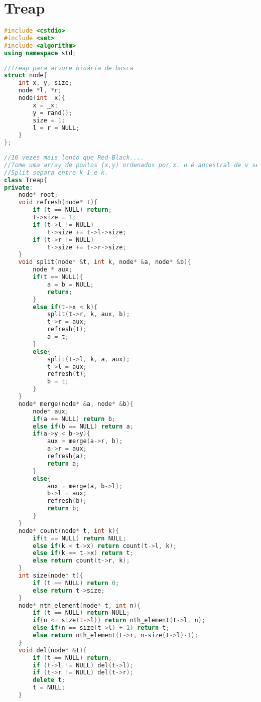 \documentclass[12pt,a4paper,twoside]{report}
\begin{document}
\section{Treap}
\noindent\begin{lstlisting}[caption=Treap,language=C++]
#include <cstdio>
#include <set>
#include <algorithm>
using namespace std;
 
//Treap para arvore binária de busca
struct node{
    int x, y, size;
    node *l, *r;
    node(int _x){
        x = _x;
        y = rand();
        size = 1;
        l = r = NULL;
    }  
};
 
//10 vezes mais lento que Red-Black....
//Tome uma array de pontos (x,y) ordenados por x. u é ancestral de v se e somente se y(u) é maior que todos os elementos de u a v, v incluso!
//Split separa entre k-1 e k.
class Treap{
private:
    node* root;
    void refresh(node* t){
        if (t == NULL) return;
        t->size = 1;
        if (t->l != NULL)
            t->size += t->l->size;
        if (t->r != NULL)
            t->size += t->r->size;
    }
    void split(node* &t, int k, node* &a, node* &b){
        node * aux;
        if(t == NULL){
            a = b = NULL;
            return;
        }
        else if(t->x < k){
            split(t->r, k, aux, b);
            t->r = aux;
            refresh(t);
            a = t;
        }
        else{
            split(t->l, k, a, aux);
            t->l = aux;
            refresh(t);
            b = t;
        }
    }
    node* merge(node* &a, node* &b){
        node* aux;
        if(a == NULL) return b;
        else if(b == NULL) return a;
        if(a->y < b->y){
            aux = merge(a->r, b);
            a->r = aux;
            refresh(a);
            return a;
        }
        else{
            aux = merge(a, b->l);
            b->l = aux;
            refresh(b);
            return b;
        }
    }
    node* count(node* t, int k){
        if(t == NULL) return NULL;
        else if(k < t->x) return count(t->l, k);
        else if(k == t->x) return t;
        else return count(t->r, k);
    }
    int size(node* t){
        if (t == NULL) return 0;
        else return t->size;
    }
    node* nth_element(node* t, int n){
        if (t == NULL) return NULL;
        if(n <= size(t->l)) return nth_element(t->l, n);
        else if(n == size(t->l) + 1) return t;
        else return nth_element(t->r, n-size(t->l)-1);
    }
    void del(node* &t){
        if (t == NULL) return;
        if (t->l != NULL) del(t->l);
        if (t->r != NULL) del(t->r);
        delete t;
        t = NULL;
    }

\end{lstlisting}
\end{document}
